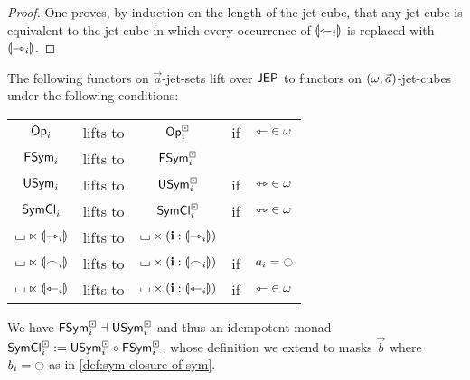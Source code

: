 \documentclass[a4paper]{memoir}
\begin{document}
\begin{proof}
	One proves, by induction on the length of the jet cube, that any jet cube is equivalent to the jet cube in which every occurrence of ${\llparenthesis \leftarrowtriangle_i \rrparenthesis}$ is replaced with ${\llparenthesis \rightarrowtriangle_i \rrparenthesis}$.
\end{proof}
\begin{proposition} \label{thm:lift-to-jet-cubes}
	The following functors on $\vec a$-jet-sets lift over $\mathsf{JEP}$ to functors on $(\omega, \vec a)$-jet-cubes under the following conditions:
	\begin{center}
		\begin{tabular}{c c c c l}
			${\mathsf{Op}}_i$ & lifts to & ${\mathsf{Op}}^\boxdot_i$ & if & ${\leftarrowtriangle} \in \omega$ \\
			$\mathsf{FSym}_i$ & lifts to & $\mathsf{FSym}^\boxdot_i$ && \\
			$\mathsf{USym}_i$ & lifts to & $\mathsf{USym}^\boxdot_i$ & if & ${\leftrightarrowtriangle} \in \omega$ \\
			$\mathsf{SymCl}_i$ & lifts to & $\mathsf{SymCl}^\boxdot_i$ & if & ${\leftrightarrowtriangle} \in \omega$ \\
			${\llcorner\hspace{-.4ex}\lrcorner} \ltimes {\llparenthesis \rightarrowtriangle_i \rrparenthesis}$ & lifts to & ${\llcorner\hspace{-.4ex}\lrcorner} \ltimes (\mathbf{i} : {\llparenthesis \rightarrowtriangle_i \rrparenthesis})$ && \\
			${\llcorner\hspace{-.4ex}\lrcorner} \ltimes {\llparenthesis \frown_i \rrparenthesis}$ & lifts to & ${\llcorner\hspace{-.4ex}\lrcorner} \ltimes (\mathbf{i} : {\llparenthesis \frown_i \rrparenthesis})$ & if & $a_i = \npolar$ \\
			${\llcorner\hspace{-.4ex}\lrcorner} \ltimes {\llparenthesis \leftarrowtriangle_i \rrparenthesis}$ & lifts to & ${\llcorner\hspace{-.4ex}\lrcorner} \ltimes (\mathbf{i} : {\llparenthesis \leftarrowtriangle_i \rrparenthesis})$ & if & ${\leftarrowtriangle} \in \omega$ \\
		\end{tabular}
	\end{center}
	We have $\mathsf{FSym}^\boxdot_i \dashv \mathsf{USym}^\boxdot_i$ and thus an idempotent monad $\mathsf{SymCl}^\boxdot_i := \mathsf{USym}^\boxdot_i \circ \mathsf{FSym}^\boxdot_i$, whose definition we extend to masks $\vec b$ where $b_i = \npolar$ as in \cref{def:sym-closure-of-sym}.
\end{proposition}
\end{document}
